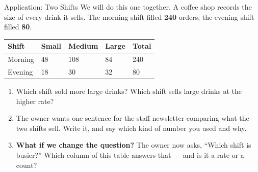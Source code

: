 \boxguard[14]
\begin{notesbox}{Application: Two Shifts}
We will do this one together. A coffee shop records the size of every drink it sells. The
morning shift filled \textbf{240} orders; the evening shift filled \textbf{80}.

\vspace{4pt}
\small
\renewcommand{\arraystretch}{1.2}
\begin{tabularx}{\linewidth}{@{} l Y Y Y Y @{}}
\textbf{Shift} & \textbf{Small} & \textbf{Medium} & \textbf{Large} & \textbf{Total} \\
\hline
Morning &  48 & 108 & 84 & 240 \\
Evening &  18 &  30 & 32 &  80 \\
\hline
\end{tabularx}

\normalsize
\begin{enumerate}[label=\textbf{\alph*.}, leftmargin=1.8em, itemsep=6pt]
  \item Which shift sold more large drinks? \blank{2.6cm} \quad
        Which shift sells large drinks at the higher rate? \blank{2.6cm}
  \item The owner wants one sentence for the staff newsletter comparing what the two shifts
        sell. Write it, and say which kind of number you used and why.
        \answerspace{1.6cm}{}
  \item \textbf{What if we change the question?} The owner now asks, ``Which shift is busier?''
        Which column of this table answers that --- and is it a rate or a count?
        \answerspace{1.4cm}{}
\end{enumerate}
\end{notesbox}


